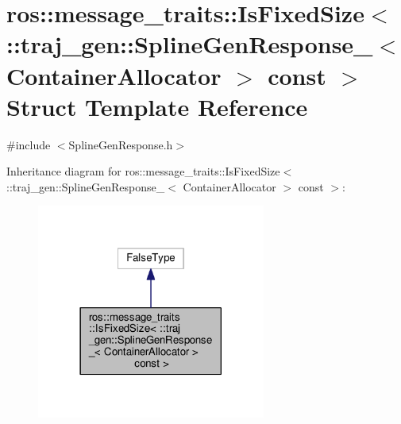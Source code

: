 \hypertarget{structros_1_1message__traits_1_1_is_fixed_size_3_01_1_1traj__gen_1_1_spline_gen_response___3_01_2336c611429bfb59739e76b3c3f70a28}{}\section{ros\+:\+:message\+\_\+traits\+:\+:Is\+Fixed\+Size$<$ \+:\+:traj\+\_\+gen\+:\+:Spline\+Gen\+Response\+\_\+$<$ Container\+Allocator $>$ const $>$ Struct Template Reference}
\label{structros_1_1message__traits_1_1_is_fixed_size_3_01_1_1traj__gen_1_1_spline_gen_response___3_01_2336c611429bfb59739e76b3c3f70a28}


{\ttfamily \#include $<$Spline\+Gen\+Response.\+h$>$}



Inheritance diagram for ros\+:\+:message\+\_\+traits\+:\+:Is\+Fixed\+Size$<$ \+:\+:traj\+\_\+gen\+:\+:Spline\+Gen\+Response\+\_\+$<$ Container\+Allocator $>$ const $>$\+:
\nopagebreak
\begin{figure}[H]
\begin{center}
\leavevmode
\includegraphics[width=213pt]{structros_1_1message__traits_1_1_is_fixed_size_3_01_1_1traj__gen_1_1_spline_gen_response___3_01_220ceb2693562013462e07899055e9c4}
\end{center}
\end{figure}


